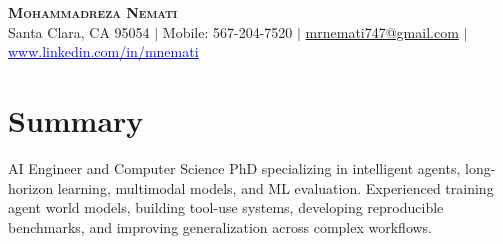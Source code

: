 \documentclass[letterpaper,13pt]{article}
\begin{document}
\begin{center}
    \textbf{\LARGE \scshape Mohammadreza Nemati} \\ \vspace{1pt}
    \small Santa Clara, CA 95054 $|$ Mobile: 567-204-7520 $|$
    \href{mailto:mrnemati747@gmail.com}{mrnemati747@gmail.com} $|$
    \href{https://www.linkedin.com/in/mnemati/}{\textcolor{blue}{\underline{www.linkedin.com/in/mnemati}}}
\end{center}

\section{Summary}
\small{AI Engineer and Computer Science PhD specializing in intelligent agents, long-horizon learning, multimodal models, and ML evaluation. Experienced training agent world models, building tool-use systems, developing reproducible benchmarks, and improving generalization across complex workflows.}
\vspace{0.05cm}
\end{document}
